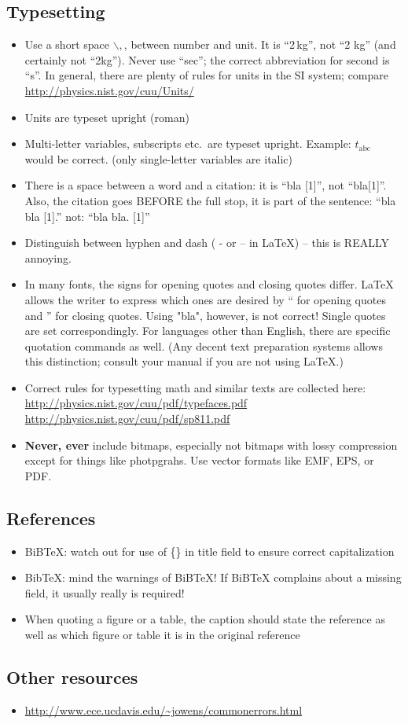 \subsection{Typesetting}
\label{sec:orgheadline3}
\begin{itemize}
\item Use a short space $\backslash,$, between number and unit. It is ``2\,kg'', not ``2 kg'' (and certainly not ``2kg''). Never use ``sec''; the correct abbreviation for second is ``s''. In general, there are plenty of rules for units in the SI system; compare \url{http://physics.nist.gov/cuu/Units/}
\item Units are typeset upright (roman)
\item Multi-letter variables, subscripts etc.\ are typeset upright. Example: \(t_\mathrm{abc}\) would be correct. (only single-letter variables are italic)
\item There is a space between a word and a citation: it is ``bla [1]'',
  not ``bla[1]''. Also, the citation goes BEFORE the full stop, it is
  part of the sentence: ``bla bla [1].'' not: ``bla bla. [1]'' 

\item Distinguish between hyphen and dash ( - or -- in \LaTeX{}) -- this is REALLY annoying. 
\item In many fonts, the signs for opening quotes and closing quotes differ. \LaTeX{} allows the writer to express which ones are desired by ``   for opening quotes and ''  for closing quotes. Using "bla", however, is not correct! Single quotes are set correspondingly.  For languages other than English, there are specific quotation commands as well. (Any decent text preparation systems allows this distinction; consult your manual if you are not using \LaTeX{}.)
\item Correct rules for typesetting math and similar texts are collected
here: \url{http://physics.nist.gov/cuu/pdf/typefaces.pdf}
\url{http://physics.nist.gov/cuu/pdf/sp811.pdf}
\item \textbf{Never, ever} include bitmaps, especially not bitmaps with lossy
compression except for things like photpgrahs. Use vector formats like EMF, EPS, or PDF.
\end{itemize}

\subsection{References}
\label{sec:orgheadline4}
\begin{itemize}
\item BiBTeX: watch out for use of \{\} in title field to ensure correct capitalization
\item BibTeX: mind the warnings of BiBTeX! If BiBTeX complains about a missing field, it usually really is required!
\item When quoting a figure or a table, the caption should state the reference as well as which figure or table it is in the original reference
\end{itemize}

\subsection{Other resources}
\label{sec:orgheadline5}
\begin{itemize}
\item \url{http://www.ece.ucdavis.edu/~jowens/commonerrors.html}
\end{itemize}
